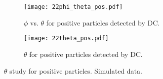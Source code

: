     \begin{figure}
        \centering
        \begin{subfigure}[b]{\textwidth}
            \centering
            \texttt{[image: 22phi\_theta\_pos.pdf]}
            \caption[$\phi$ vs. $\theta$ for positive particles]
            {$\phi$ vs. $\theta$ for positive particles detected by DC.}
            \label{fig::14.22::phi_theta_pos}
        \end{subfigure}
        \begin{subfigure}[b]{\textwidth}
            \centering
            \texttt{[image: 22theta\_pos.pdf]}
            \caption[$\theta$ for positive particles]
            {$\theta$ for positive particles detected by DC.}
            \label{fig::14.22::theta_pos}
        \end{subfigure}
        \caption[$\theta$ study for positive particles]
        {$\theta$ study for positive particles.
        Simulated data.}
        \label{fig::14.22::theta_study_pos}
    \end{figure}

    \pagebreak
